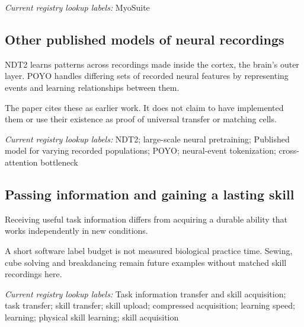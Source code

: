 \noindent\textit{Current registry lookup labels:} MyoSuite\par

\begin{samepage}
\subsection*{Other published models of neural recordings}
\noindent NDT2 learns patterns across recordings made inside the cortex, the brain’s outer layer. POYO handles differing sets of recorded neural features by representing events and learning relationships between them.\par
\end{samepage}
\begin{samepage}
\noindent The paper cites these as earlier work. It does not claim to have implemented them or use their existence as proof of universal transfer or matching cells.\par\nopagebreak[4]

\end{samepage}


\noindent\textit{Current registry lookup labels:} NDT2; large-scale neural pretraining; Published model for varying recorded populations; POYO; neural-event tokenization; cross-attention bottleneck\par

\begin{samepage}
\subsection*{Passing information and gaining a lasting skill}
\noindent Receiving useful task information differs from acquiring a durable ability that works independently in new conditions.\par
\end{samepage}
\begin{samepage}
\noindent A short software label budget is not measured biological practice time. Sewing, cube solving and breakdancing remain future examples without matched skill recordings here.\par\nopagebreak[4]

\end{samepage}


\noindent\textit{Current registry lookup labels:} Task information transfer and skill acquisition; task transfer; skill transfer; skill upload; compressed acquisition; learning speed; learning; physical skill learning; skill acquisition\par

